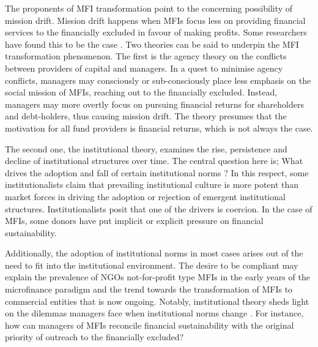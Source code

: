 \documentclass[a4paper, nobind]{templates/ociamthesis}
\begin{document}
The proponents of MFI transformation point to the concerning possibility of mission drift. Mission drift happens when MFIs focus less on providing financial services to the financially excluded in favour of making profits. Some researchers have found this to be the case \autocite{louis2013financial,bos2015practice,d2013unsubsidized,hartarska2012governance}. Two theories can be said to underpin the MFI transformation phenomenon. The first is the agency theory on the conflicts between providers of capital and managers. In a quest to minimise agency conflicts, managers may consciously or sub-consciously place less emphasis on the social mission of MFIs, reaching out to the financially excluded. Instead, managers may more overtly focus on pursuing financial returns for shareholders and debt-holders, thus causing mission drift. The theory presumes that the motivation for all fund providers is financial returns, which is not always the case.

The second one, the institutional theory, examines the rise, persistence and decline of institutional structures over time. The central question here is; What drives the adoption and fall of certain institutional norms \autocite{powell2012new}? In this respect, some institutionalists claim that prevailing institutional culture is more potent than market forces in driving the adoption or rejection of emergent institutional structures. Institutionalists posit that one of the drivers is coercion. In the case of MFIs, some donors have put implicit or explicit pressure on financial sustainability.

Additionally, the adoption of institutional norms in most cases arises out of the need to fit into the institutional environment. The desire to be compliant may explain the prevalence of NGOs not-for-profit type MFIs in the early years of the microfinance paradigm and the trend towards the transformation of MFIs to commercial entities that is now ongoing. Notably, institutional theory sheds light on the dilemmas managers face when institutional norms change \autocite{thornton2015institutional}. For instance, how can managers of MFIs reconcile financial sustainability with the original priority of outreach to the financially excluded?
\end{document}
